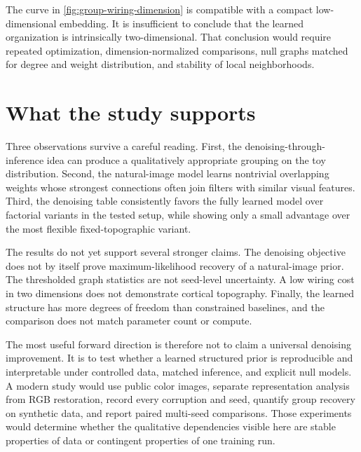 The curve in \cref{fig:group-wiring-dimension} is compatible with a compact low-dimensional embedding. It is insufficient to conclude that the learned organization is intrinsically two-dimensional. That conclusion would require repeated optimization, dimension-normalized comparisons, null graphs matched for degree and weight distribution, and stability of local neighborhoods.

\section{What the study supports}
\label{sec:group-discussion}

Three observations survive a careful reading. First, the denoising-through-inference idea can produce a qualitatively appropriate grouping on the toy distribution. Second, the natural-image model learns nontrivial overlapping weights whose strongest connections often join filters with similar visual features. Third, the denoising table consistently favors the fully learned model over factorial variants in the tested setup, while showing only a small advantage over the most flexible fixed-topographic variant.

The results do not yet support several stronger claims. The denoising objective does not by itself prove maximum-likelihood recovery of a natural-image prior. The thresholded graph statistics are not seed-level uncertainty. A low wiring cost in two dimensions does not demonstrate cortical topography. Finally, the learned structure has more degrees of freedom than constrained baselines, and the comparison does not match parameter count or compute.

The most useful forward direction is therefore not to claim a universal denoising improvement. It is to test whether a learned structured prior is reproducible and interpretable under controlled data, matched inference, and explicit null models. A modern study would use public color images, separate representation analysis from RGB restoration, record every corruption and seed, quantify group recovery on synthetic data, and report paired multi-seed comparisons. Those experiments would determine whether the qualitative dependencies visible here are stable properties of data or contingent properties of one training run.
